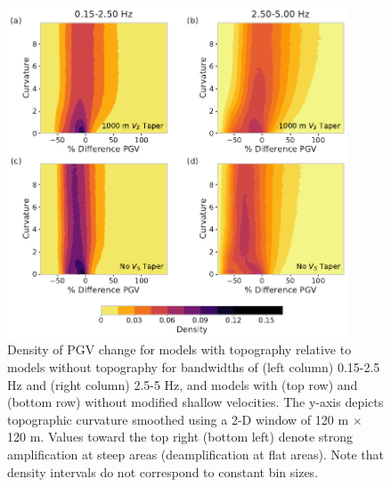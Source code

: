 \begin{figure}[!ht]
  \centering
  \includegraphics[width=0.9\textwidth,height=0.9\textheight,keepaspectratio]{figures/figure_highf_S3.pdf}
  \caption{
  Density of PGV change for models with topography relative to models without topography for bandwidths of (left column) 0.15-2.5 Hz and (right column) 2.5-5 Hz, and models with (top row) and (bottom row) without modified shallow velocities. The y-axis depicts topographic curvature smoothed using a 2-D window of 120 m $\times$ 120 m. Values toward the top right (bottom left) denote strong amplification at steep areas (deamplification at flat areas). Note that density intervals do not correspond to constant bin sizes.
  }
  \label{fig:highf-S3}
\end{figure}
\clearpage




\renewcommand{\thetable}{\arabic{table}}
\renewcommand{\thefigure}{\arabic{figure}}


